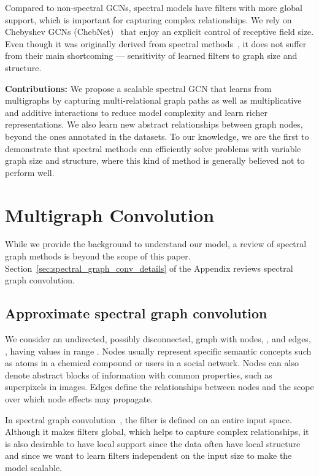 \documentclass[final,nonatbib]{article} \usepackage{nips_2018}
\begin{document}
	Compared to non-spectral GCNs, spectral models have filters with more global support, which is important for capturing complex relationships. We rely on Chebyshev GCNs (ChebNet)~\cite{defferrard2016convolutional} that enjoy an explicit control of receptive
	field size. Even though it was originally derived from spectral methods~\cite{bruna2013spectral}, it does not suffer from their main shortcoming --- sensitivity of learned filters to graph size and structure.

	\textbf{Contributions:} We propose a scalable spectral GCN that learns from multigraphs by capturing multi-relational graph paths as well as multiplicative and additive interactions to reduce model complexity and learn richer representations. We also learn new abstract relationships between graph nodes, beyond the ones annotated in the datasets. To our knowledge, we are the first to demonstrate that spectral methods can efficiently solve problems with variable graph size and structure, where this kind of method is generally believed not to perform well.

	\section{Multigraph Convolution}\label{sec:multigraph}
	While we provide the background to understand our model, a review of spectral graph methods is beyond the scope of this paper. Section~\ref{sec:spectral_graph_conv_details} of the Appendix reviews spectral graph convolution.
\subsection{Approximate spectral graph convolution}
\label{sec:spectral_graph_conv}
We consider an undirected, possibly disconnected, graph  with  nodes, , and edges, , having values in range . Nodes  usually represent specific semantic concepts such as atoms in a chemical compound or users in a social network. Nodes can also denote abstract blocks of information with common properties, such as superpixels in images. Edges  define the relationships between nodes and the scope over which node effects may propagate.

	In spectral graph convolution~\cite{bruna2013spectral}, the filter  is defined on an entire input space.
	Although it makes filters global, which helps to capture complex relationships, it is also desirable to have local support since the data often have local structure and since we want to learn filters independent on the input size  to make the model scalable.
\end{document}
